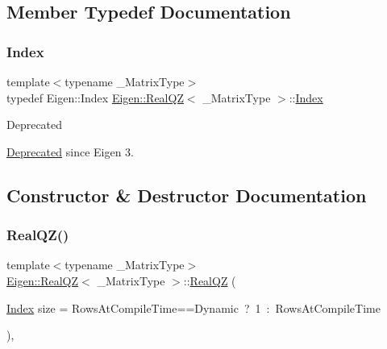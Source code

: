 \subsection{Member Typedef Documentation}
\mbox{\label{class_eigen_1_1_real_q_z_a6201e534e901b5f4e66f72c176b534a3}} 
\subsubsection{\texorpdfstring{Index}{Index}}
{\footnotesize\ttfamily template$<$typename \+\_\+\+Matrix\+Type$>$ \\
typedef Eigen\+::\+Index \mbox{\hyperlink{class_eigen_1_1_real_q_z}{Eigen\+::\+Real\+QZ}}$<$ \+\_\+\+Matrix\+Type $>$\+::\mbox{\hyperlink{class_eigen_1_1_real_q_z_a6201e534e901b5f4e66f72c176b534a3}{Index}}}

\begin{DoxyRefDesc}{Deprecated}
\item[\mbox{\hyperlink{deprecated__deprecated000021}{Deprecated}}]since Eigen 3. \end{DoxyRefDesc}


\subsection{Constructor \& Destructor Documentation}
\mbox{\label{class_eigen_1_1_real_q_z_ad8fb9235870a8361a2fdd8dcc2e80d01}} 
\subsubsection{\texorpdfstring{RealQZ()}{RealQZ()}\hspace{0.1cm}{\footnotesize\ttfamily [1/2]}}
{\footnotesize\ttfamily template$<$typename \+\_\+\+Matrix\+Type$>$ \\
\mbox{\hyperlink{class_eigen_1_1_real_q_z}{Eigen\+::\+Real\+QZ}}$<$ \+\_\+\+Matrix\+Type $>$\+::\mbox{\hyperlink{class_eigen_1_1_real_q_z}{Real\+QZ}} (\begin{DoxyParamCaption}\item[{\mbox{\hyperlink{class_eigen_1_1_real_q_z_a6201e534e901b5f4e66f72c176b534a3}{Index}}}]{size = {\ttfamily RowsAtCompileTime==Dynamic~?~1~\+:~RowsAtCompileTime} }\end{DoxyParamCaption})\hspace{0.3cm}{\ttfamily [inline]}, {\ttfamily [explicit]}}



